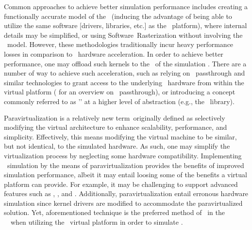 Common approaches to achieve better simulation performance includes creating a functionally accurate model of the \termgpu\ (inducing the advantage of being able to utilize the same software [drivers, libraries, etc.] as the \termhost\ platform), where internal details may be simplified, or using Software~Rasterization without involving the \termgpu\ model.
However, these methodologies traditionally incur heavy performance losses in comparison to \termgpu\ hardware acceleration.
In order to achieve better performance, one may offload such kernels to the \termgpu\ of the simulation \termhost .
There are a number of way to achieve such acceleration, such as relying on \termpci ~passthrough and similar technologies to grant access to the underlying \termhost\ hardware from within the virtual platform ( for an overview on \termpci ~passthrough), or introducing a concept commonly referred to as '\termparavirtualization ' at a higher level of abstraction (e.g., the \termopengl\ library).


Paravirtualization is a relatively new term\ originally defined as selectively modifying the virtual architecture to enhance scalability, performance, and simplicity.
Effectively, this means modifying the virtual machine to be similar, but not identical, to the simulated hardware.
As such, one may simplify the virtualization process by neglecting some hardware compatibility.
Implementing \termgpu\ simulation by the means of paravirtualization provides the benefits of improved simulation performance, albeit it may entail loosing some of the benefits a virtual platform can provide.
For example, it may be challenging to support advanced features such as \termdetexe , \termcheckpointing , and \termrevexe .
Additionally, paravirtualization entail erronous hardware simulation since kernel drivers are modified to accommodate the paravirtualized solution.  
Yet, aforementioned technique is the preferred method of \termgoogle\ in the \termandroid ~\termsdk\ when utilizing the \termqemu\ virtual platform in order to simulate \termopengles.\\

